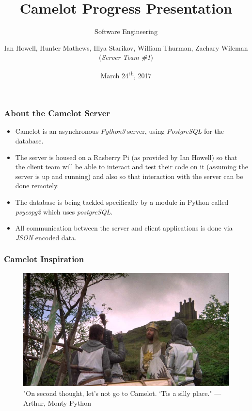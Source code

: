 \documentclass{beamer}
\title{Camelot Progress Presentation}
\subtitle{Software Engineering}
\author{Ian Howell, Hunter Mathews, Illya Starikov, William Thurman, Zachary Wileman (\textit{Server Team \#1})}
\date{March 24\textsuperscript{th}, 2017}
\institute{Missouri University of Science and Technology}
\begin{document}
\maketitle


\begin{frame}
    \frametitle{About the Camelot Server}
    \begin{itemize}
        \item Camelot is an asynchronous \textit{Python3} server, using \textit{PostgreSQL} for the database.
        \item The server is housed on a Rasberry Pi (as provided by Ian Howell) so that the client team will be able to interact and test their code on it (assuming the server is up and running) and also so that interaction with the server can be done remotely.
        \item The database is being tackled specifically by a module in Python called \textit{psycopg2} which uses \textit{postgreSQL}.
        \item All communication between the server and client applications is done via \textit{JSON} encoded data.
    \end{itemize}
\end{frame}


\begin{frame}
    \frametitle{Camelot Inspiration}

    \begin{figure}
        \centering
        \includegraphics[width=\textwidth]{images/camelot}
        \caption{"On second thought, let's not go to Camelot. `Tis a silly place." — Arthur, Monty Python}
        \label{fig:camelot}
    \end{figure}
\end{frame}
\end{document}
